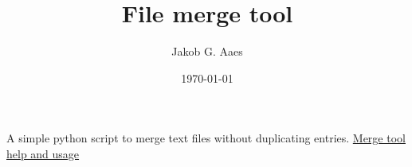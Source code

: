 \documentclass[11pt]{article}
\author{Jakob G. Aaes}
\date{\today}
\title{File merge tool}
\begin{document}
\maketitle
\tableofcontents

A simple python script to merge text files without duplicating entries.
\href{merge.png}{Merge tool help and usage}
\end{document}
